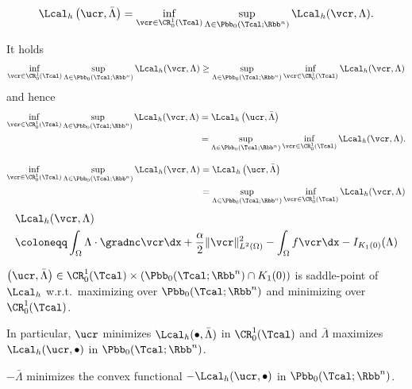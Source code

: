\begin{frame}
  \begin{align*}
    \Lcal_h\left(\ucr,\bar\Lambda\right)=
    \inf_{\vcr\in\CR^1_0(\Tcal)}\sup_{\Lambda\in\Pbb_0(\Tcal;\Rbb^n)} 
    \Lcal_h(\vcr,\Lambda).
  \end{align*}
  \pause


  \pause

  It holds
  \begin{align*}
    \inf_{\vcr\in\CR^1_0(\Tcal)}\sup_{\Lambda\in\Pbb_0(\Tcal;\Rbb^n)} 
    \Lcal_h(\vcr,\Lambda)
    \geq 
    \sup_{\Lambda\in\Pbb_0(\Tcal;\Rbb^n)} \inf_{\vcr\in\CR^1_0(\Tcal)} 
    \Lcal_h(\vcr,\Lambda)
  \end{align*}
  and hence
  \begin{align*}
    \inf_{\vcr\in\CR^1_0(\Tcal)}\sup_{\Lambda\in\Pbb_0(\Tcal;\Rbb^n)} 
    \Lcal_h(\vcr,\Lambda)
    &=
    \Lcal_h\left(\ucr,\bar\Lambda\right)\\
    &=
    \sup_{\Lambda\in\Pbb_0(\Tcal;\Rbb^n)} \inf_{\vcr\in\CR^1_0(\Tcal)} 
    \Lcal_h(\vcr,\Lambda).
  \end{align*}
\end{frame}

\begin{frame}
  \begin{align*}
    \inf_{\vcr\in\CR^1_0(\Tcal)}\sup_{\Lambda\in\Pbb_0(\Tcal;\Rbb^n)} 
    \Lcal_h(\vcr,\Lambda)
    &=
    \Lcal_h\left(\ucr,\bar\Lambda\right)\\
    &=
    \sup_{\Lambda\in\Pbb_0(\Tcal;\Rbb^n)} \inf_{\vcr\in\CR^1_0(\Tcal)} 
    \Lcal_h(\vcr,\Lambda)
  \end{align*}
  \begin{align*}
    &\Lcal_h(\vcr,\Lambda) \\
    &\coloneqq \int_\Omega\Lambda\cdot\gradnc\vcr\dx +
    \frac{\alpha}{2}\Vert \vcr\Vert^2_{L^2(\Omega)} -\int_\Omega f\vcr\dx
    - I_{K_1(0)}(\Lambda)
  \end{align*}

  $\left(\ucr,\bar\Lambda\right)\in 
  \CR^1_0(\Tcal)\times (\Pbb_0(\Tcal;\Rbb^n)\cap K_1(0))$ is saddle-point
  of $\Lcal_h$ w.r.t.\ maximizing over $\Pbb_0(\Tcal;\Rbb^n)$ and
  minimizing over $\CR^1_0(\Tcal)$. 

  \pause
  \medskip

  In particular, $\ucr$ minimizes
  $\Lcal_h(\bullet, \bar\Lambda)$ in $\CR^1_0(\Tcal)$ and $\bar\Lambda$
  maximizes $\Lcal_h(\ucr,\bullet)$ in $\Pbb_0(\Tcal;\Rbb^n)$.

  \medskip
  \pause

  $-\bar\Lambda$ minimizes  the convex functional
  $-\Lcal_h(\ucr,\bullet)$ in $\Pbb_0(\Tcal;\Rbb^n)$.
\end{frame}

